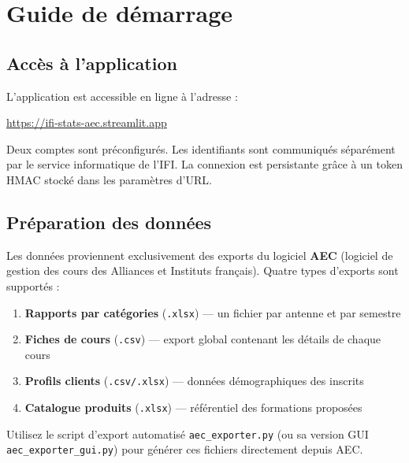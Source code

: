 \documentclass[12pt,a4paper,twoside]{article}
\begin{document}
\section{Guide de d\'{e}marrage}

\subsection{Acc\`{e}s \`{a} l'application}

L'application est accessible en ligne \`{a} l'adresse :

\begin{center}
\url{https://ifi-stats-aec.streamlit.app}
\end{center}

\begin{infobox}[Connexion]
Deux comptes sont pr\'{e}configur\'{e}s. Les identifiants sont communiqu\'{e}s s\'{e}par\'{e}ment par le service informatique de l'IFI. La connexion est persistante gr\^{a}ce \`{a} un token HMAC stock\'{e} dans les param\`{e}tres d'URL.
\end{infobox}

\subsection{Pr\'{e}paration des donn\'{e}es}

Les donn\'{e}es proviennent exclusivement des exports du logiciel \textbf{AEC} (logiciel de gestion des cours des Alliances et Instituts fran\c{c}ais). Quatre types d'exports sont support\'{e}s :

\begin{enumerate}[leftmargin=2em]
  \item \textbf{Rapports par cat\'{e}gories} (\texttt{.xlsx}) --- un fichier par antenne et par semestre
  \item \textbf{Fiches de cours} (\texttt{.csv}) --- export global contenant les d\'{e}tails de chaque cours
  \item \textbf{Profils clients} (\texttt{.csv/.xlsx}) --- donn\'{e}es d\'{e}mographiques des inscrits
  \item \textbf{Catalogue produits} (\texttt{.xlsx}) --- r\'{e}f\'{e}rentiel des formations propos\'{e}es
\end{enumerate}

\begin{tipbox}[Conseil]
Utilisez le script d'export automatis\'{e} \texttt{aec\_exporter.py} (ou sa version GUI \texttt{aec\_exporter\_gui.py}) pour g\'{e}n\'{e}rer ces fichiers directement depuis AEC.
\end{tipbox}
\end{document}
